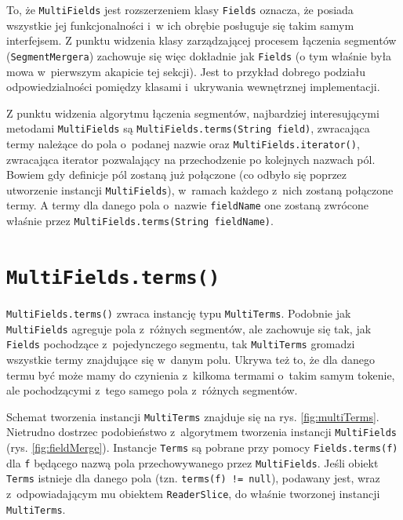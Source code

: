 To, że \texttt{MultiFields} jest rozszerzeniem klasy \texttt{Fields} oznacza, że posiada wszystkie jej funkcjonalności i~w ich obrębie posługuje się takim samym interfejsem. Z punktu widzenia klasy zarządzającej procesem łączenia segmentów (\texttt{SegmentMergera}) zachowuje się więc dokładnie jak \texttt{Fields} (o tym właśnie była mowa w~pierwszym akapicie tej sekcji). Jest to przykład dobrego podziału odpowiedzialności pomiędzy klasami i~ukrywania wewnętrznej implementacji.

Z punktu widzenia algorytmu łączenia segmentów, najbardziej interesującymi metodami \texttt{MultiFields} są \texttt{MultiFields.terms(String field)}, zwracająca termy należące do pola o~podanej nazwie oraz \texttt{MultiFields.iterator()}, zwracająca iterator pozwalający na przechodzenie po kolejnych nazwach pól. Bowiem gdy definicje pól zostaną już połączone (co odbyło się poprzez utworzenie instancji \texttt{MultiFields}), w~ramach każdego z~nich zostaną połączone termy. A termy dla danego pola o~nazwie \texttt{fieldName} one zostaną zwrócone właśnie przez \texttt{MultiFields.terms(String fieldName)}.

\section{\texttt{MultiFields.terms()}}

\texttt{MultiFields.terms()} zwraca instancję typu \texttt{MultiTerms}. Podobnie jak \texttt{MultiFields} agreguje pola z~różnych segmentów, ale zachowuje się tak, jak \texttt{Fields} pochodzące z~pojedynczego segmentu, tak \texttt{MultiTerms}  gromadzi wszystkie termy znajdujące się w~danym polu. Ukrywa też to, że dla danego termu być może mamy do czynienia z~kilkoma termami o~takim samym tokenie, ale pochodzącymi z~tego samego pola z~różnych segmentów.

Schemat tworzenia instancji \texttt{MultiTerms} znajduje się na rys. \ref{fig:multiTerms}. Nietrudno dostrzec podobieństwo z~algorytmem tworzenia instancji \texttt{MultiFields} (rys. \ref{fig:fieldMerge}). Instancje \texttt{Terms} są pobrane przy pomocy \texttt{Fields.terms(f)} dla \texttt{f} będącego nazwą pola przechowywanego przez \texttt{MultiFields}. Jeśli obiekt \texttt{Terms} istnieje dla danego pola (tzn. \texttt{terms(f) != null}), podawany jest, wraz z~odpowiadającym mu obiektem \texttt{ReaderSlice}, do właśnie tworzonej instancji \texttt{MultiTerms}.

